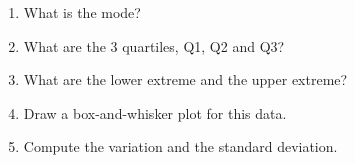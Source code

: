 \documentclass{article}
\begin{document}
\begin{enumerate}
\begin{enumerate}
\item What is the mode?

\vspace{0.5in}

\item What are the 3 quartiles, Q1, Q2 and Q3?

\vspace{1in}

\item What are the lower extreme and the upper extreme?

\vspace{0.5in}

\item Draw a box-and-whisker plot for this data.

\vspace{2in}

\item Compute the variation and the standard deviation.

\end{enumerate}

\end{enumerate}
\end{document}
